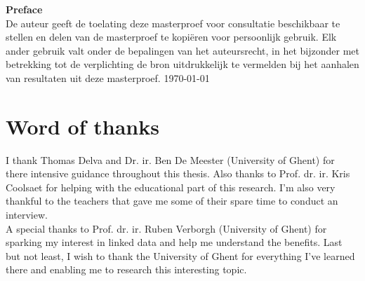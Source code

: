 \noindent
\LARGE\textbf{Preface}\\

\noindent\large
De auteur geeft de toelating deze masterproef voor consultatie beschikbaar te stellen en delen van de masterproef te kopiëren voor persoonlijk gebruik. Elk ander gebruik valt onder de bepalingen van het auteursrecht, in het bijzonder met betrekking tot de verplichting de bron uitdrukkelijk te vermelden bij het aanhalen van resultaten uit deze masterproef.
\today
\section*{Word of thanks}
I thank Thomas Delva and Dr. ir. Ben De Meester (University of Ghent) for there intensive guidance throughout this thesis.
Also thanks to Prof. dr. ir. Kris Coolsaet for helping with the educational part of this research.
I'm also very thankful to the teachers that gave me some of their spare time to conduct an interview.\\ 
A special thanks to Prof. dr. ir. Ruben Verborgh (University of Ghent) for sparking my interest in linked data and help me understand the benefits.
Last but not least, I wish to thank the University of Ghent for everything I've learned there and enabling me to research this interesting topic.